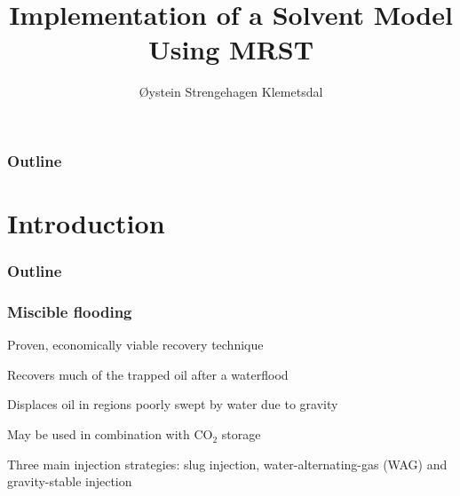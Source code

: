 \documentclass[screen, aspectratio=43]{beamer}
\title[Short title]{Implementation of a Solvent Model Using MRST}
\author[Ø.S. Klemetsdal]{Øystein Strengehagen Klemetsdal}
\institute[NTNU]{Department of Mathematical Sciences, NTNU}
\date{} %
\newcommand{\myitemmark}{\raisebox{.75ex}{\scalebox{.6}{\protect\colorbox{ntnublue}{\protect}}}}
\newenvironment{prettyList}
{
  \begin{list}{\myitemmark}{\leftmargin=1.5em \itemindent=0em} 
}
{
  \end{list}
}
\begin{document}
\ntnutitlepage

\begin{frame}
  \frametitle{Outline}
  \tableofcontents
\end{frame}

\section{Introduction}

\begin{frame}
  \frametitle{Outline}
  \tableofcontents[currentsection]
\end{frame}


\begin{frame}
  \frametitle{Miscible flooding}
  \vspace{0.5cm}
  Proven, economically viable recovery technique \cite{petroWiki2017Misc}
  \begin{prettyList}
  \item Recovers much of the trapped oil after a waterflood
  \item Displaces oil in regions poorly swept by water due to gravity
  \item May be used in combination with CO$_2$ storage
  \item Three main injection strategies: slug injection, water-alternating-gas (WAG) and
    gravity-stable injection
  \end{prettyList}
  \begin{figure}[h]
    \centering
    \hspace{1em}
  \end{figure}
\end{frame}
\end{document}
